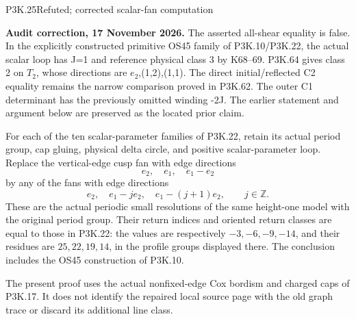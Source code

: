 \begin{statement}{P3K.25}{Refuted; corrected scalar-fan computation}
\par\noindent\textbf{Audit correction, 17 November 2026.} The asserted all-shear equality is false. In the explicitly constructed primitive OS45 family of P3K.10/P3K.22, the actual scalar loop has J=1 and reference physical class 3 by K68--69. P3K.64 gives class 2 on \(T_2\), whose directions are \(e_2\),(1,2),(1,1). The direct initial/reflected C2 equality remains the narrow comparison proved in P3K.62. The outer C1 determinant has the previously omitted winding -2J. The earlier statement and argument below are preserved as the located prior claim.
\medskip

For each of the ten scalar-parameter families of P3K.22, retain its
actual period group, cap gluing, physical delta circle, and positive
scalar-parameter loop. Replace the vertical-edge cusp fan with edge
directions
\[
 e_2,\quad e_1,\quad e_1-e_2
\]
by any of the fans with edge directions
\[
 e_2,\quad e_1-j e_2,\quad e_1-(j+1)e_2,\qquad j\in\mathbb Z.
                                                        \tag{P3K.25.1}
\]
These are the actual periodic small resolutions of the same
height-one model with the original period group. Their return
indices and oriented return classes are equal to those in P3K.22:
the values are respectively \(-3,-6,-9,-14\), and their residues
are \(25,22,19,14\), in the profile groups displayed there.
The conclusion includes the OS45 construction of P3K.10.

The present proof uses the actual nonfixed-edge Cox bordism and
charged caps of P3K.17. It does not identify the repaired local
source page with the old graph trace or discard its additional
line class.
\end{statement}
